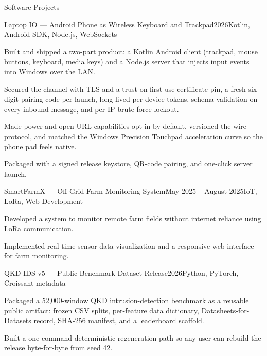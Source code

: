 \documentclass{resume} %
\begin{document}
\begin{rSection}{Software Projects}

\begin{rSubsection}{Laptop IO — Android Phone as Wireless Keyboard and Trackpad}{2026}{Kotlin, Android SDK, Node.js, WebSockets}{}
\item Built and shipped a two-part product: a Kotlin Android client (trackpad, mouse buttons, keyboard, media keys) and a Node.js server that injects input events into Windows over the LAN.
\item Secured the channel with TLS and a trust-on-first-use certificate pin, a fresh six-digit pairing code per launch, long-lived per-device tokens, schema validation on every inbound message, and per-IP brute-force lockout.
\item Made power and open-URL capabilities opt-in by default, versioned the wire protocol, and matched the Windows Precision Touchpad acceleration curve so the phone pad feels native.
\item Packaged with a signed release keystore, QR-code pairing, and one-click server launch.
\end{rSubsection}
\vspace{.1cm}

\begin{rSubsection}{SmartFarmX — Off-Grid Farm Monitoring System}{May 2025 – August 2025}{IoT, LoRa, Web Development}{}
\item Developed a system to monitor remote farm fields without internet reliance using LoRa communication.
\item Implemented real-time sensor data visualization and a responsive web interface for farm monitoring.
\end{rSubsection}
\vspace{.1cm}

\begin{rSubsection}{QKD-IDS-v5 — Public Benchmark Dataset Release}{2026}{Python, PyTorch, Croissant metadata}{}
\item Packaged a 52,000-window QKD intrusion-detection benchmark as a reusable public artifact: frozen CSV splits, per-feature data dictionary, Datasheets-for-Datasets record, SHA-256 manifest, and a leaderboard scaffold.
\item Built a one-command deterministic regeneration path so any user can rebuild the release byte-for-byte from seed 42.
\end{rSubsection}

\end{rSection}
\end{document}
